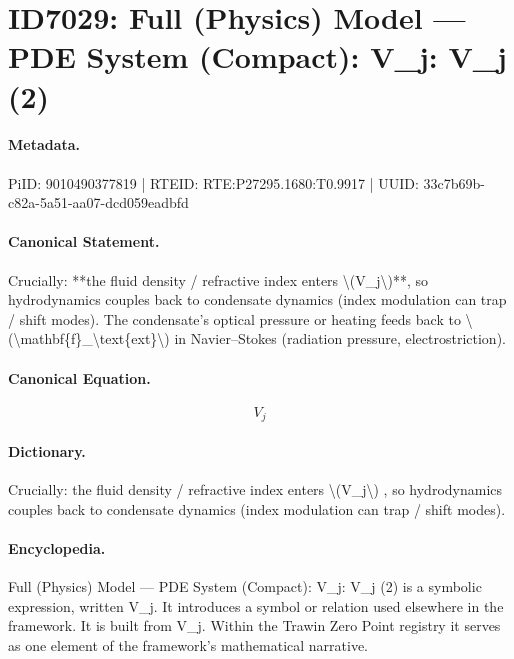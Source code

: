 \section*{ID7029: Full (Physics) Model — PDE System (Compact): V\_j: V\_j (2)}
\paragraph{Metadata.}
PiID: 9010490377819 | RTEID: RTE:P27295.1680:T0.9917 | UUID: 33c7b69b-c82a-5a51-aa07-dcd059eadbfd

\paragraph{Canonical Statement.}
Crucially: **the fluid density / refractive index enters \textbackslash{}(V\_j\textbackslash{})**, so hydrodynamics couples back to condensate dynamics (index modulation can trap / shift modes). The condensate’s optical pressure or heating feeds back to \textbackslash{}(\textbackslash{}mathbf\{f\}\_\textbackslash{}text\{ext\}\textbackslash{}) in Navier–Stokes (radiation pressure, electrostriction).

\paragraph{Canonical Equation.}
\[
V_j
\]

\paragraph{Dictionary.}
Crucially: the fluid density / refractive index enters \textbackslash{}(V\_j\textbackslash{}) , so hydrodynamics couples back to condensate dynamics (index modulation can trap / shift modes).

\paragraph{Encyclopedia.}
Full (Physics) Model — PDE System (Compact): V\_j: V\_j (2) is a symbolic expression, written V\_j. It introduces a symbol or relation used elsewhere in the framework. It is built from V\_j. Within the Trawin Zero Point registry it serves as one element of the framework's mathematical narrative.
